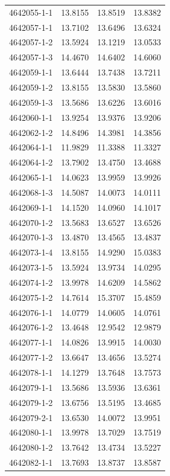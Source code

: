 \begin{longtable}{lrrr}
4642055-1-1 & 13.8155 & 13.8519 & 13.8382 \\
4642057-1-1 & 13.7102 & 13.6496 & 13.6324 \\
4642057-1-2 & 13.5924 & 13.1219 & 13.0533 \\
4642057-1-3 & 14.4670 & 14.6402 & 14.6060 \\
4642059-1-1 & 13.6444 & 13.7438 & 13.7211 \\
4642059-1-2 & 13.8155 & 13.5830 & 13.5860 \\
4642059-1-3 & 13.5686 & 13.6226 & 13.6016 \\
4642060-1-1 & 13.9254 & 13.9376 & 13.9206 \\
4642062-1-2 & 14.8496 & 14.3981 & 14.3856 \\
4642064-1-1 & 11.9829 & 11.3388 & 11.3327 \\
4642064-1-2 & 13.7902 & 13.4750 & 13.4688 \\
4642065-1-1 & 14.0623 & 13.9959 & 13.9926 \\
4642068-1-3 & 14.5087 & 14.0073 & 14.0111 \\
4642069-1-1 & 14.1520 & 14.0960 & 14.1017 \\
4642070-1-2 & 13.5683 & 13.6527 & 13.6526 \\
4642070-1-3 & 13.4870 & 13.4565 & 13.4837 \\
4642073-1-4 & 13.8155 & 14.9290 & 15.0383 \\
4642073-1-5 & 13.5924 & 13.9734 & 14.0295 \\
4642074-1-2 & 13.9978 & 14.6209 & 14.5862 \\
4642075-1-2 & 14.7614 & 15.3707 & 15.4859 \\
4642076-1-1 & 14.0779 & 14.0605 & 14.0761 \\
4642076-1-2 & 13.4648 & 12.9542 & 12.9879 \\
4642077-1-1 & 14.0826 & 13.9915 & 14.0030 \\
4642077-1-2 & 13.6647 & 13.4656 & 13.5274 \\
4642078-1-1 & 14.1279 & 13.7648 & 13.7573 \\
4642079-1-1 & 13.5686 & 13.5936 & 13.6361 \\
4642079-1-2 & 13.6756 & 13.5195 & 13.4685 \\
4642079-2-1 & 13.6530 & 14.0072 & 13.9951 \\
4642080-1-1 & 13.9978 & 13.7029 & 13.7519 \\
4642080-1-2 & 13.7642 & 13.4734 & 13.5227 \\
4642082-1-1 & 13.7693 & 13.8737 & 13.8587 \\

\end{longtable}
